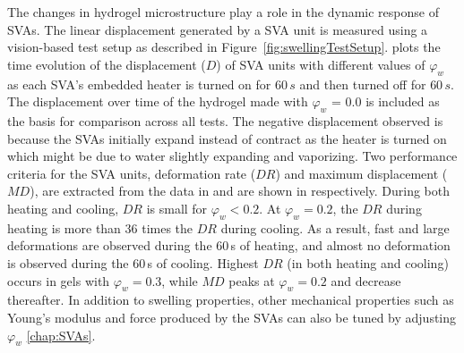 The changes in hydrogel microstructure play a role in the dynamic response of SVAs. The linear displacement generated by a SVA unit
is measured using a vision-based test setup as described in Figure~\ref{fig:swellingTestSetup}.  plots the time evolution of the displacement ($D$) of SVA units with different values of $\varphi_w$ 
as each SVA's embedded heater is turned on for $60\,s$ 
and then turned off for $60\,s$. The displacement over time of the hydrogel made with \(\varphi_{w}\) = 0.0 is included as the basis for comparison across all tests. The negative displacement observed is because the SVAs initially expand instead of contract as the heater is turned on which might be due to water slightly expanding and vaporizing. Two performance criteria for the SVA units, deformation rate ($DR$) and maximum displacement ($MD$), are extracted from the data in  and are shown in  respectively. During both heating and cooling, $DR$ is small for \(\varphi_{w} < 0.2\). At \(\varphi_{w} = 0.2\), the $DR$ during heating is more than 36 times the $DR$ during cooling. As a result, fast and large deformations are observed during the 60\,s of heating, and almost no deformation is observed during the 60\,s of cooling. 
Highest $DR$ (in both heating and cooling) occurs in gels with $\varphi_w = 0.3$, while $MD$ peaks at $\varphi_w = 0.2$ and decrease thereafter.
In addition to swelling properties, other mechanical properties such as Young's modulus and force produced by the SVAs can also be tuned by adjusting \(\varphi_{w}\) \ref{chap:SVAs}.\\ 
